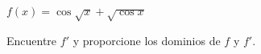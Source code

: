 \item $f(x) = \cos \sqrt{x} + \sqrt{\cos x}$
\par
Encuentre $f'$ y proporcione los dominios de $f$ y $f'$.
